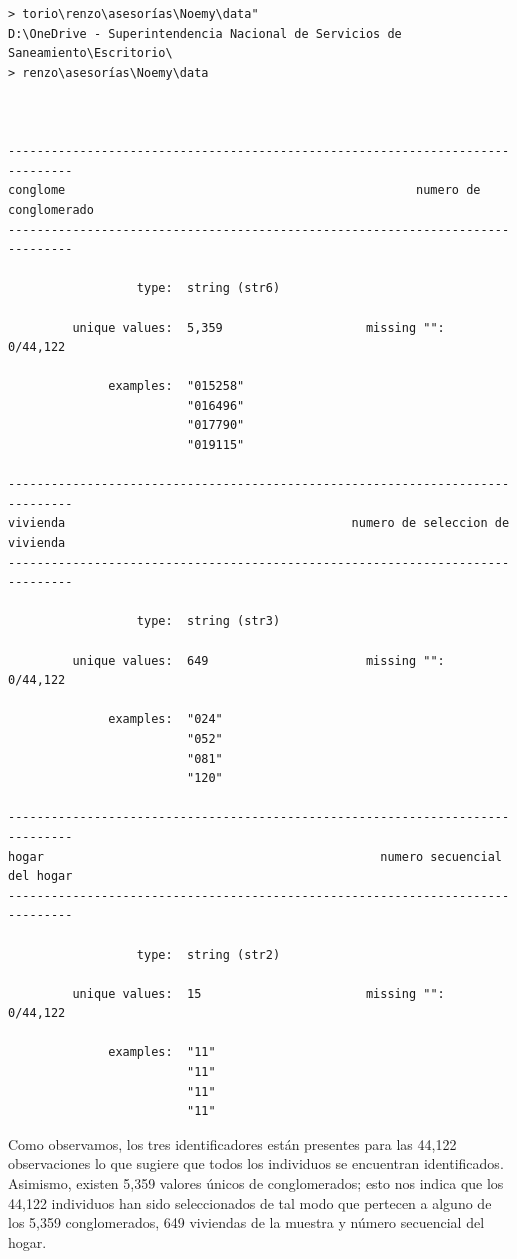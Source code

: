 \documentclass[
]{book}
\theoremstyle{definition}
\theoremstyle{definition}
\theoremstyle{definition}
\theoremstyle{definition}
\theoremstyle{remark}
\begin{document}
\begin{verbatim}
> torio\renzo\asesorías\Noemy\data"
D:\OneDrive - Superintendencia Nacional de Servicios de Saneamiento\Escritorio\
> renzo\asesorías\Noemy\data



-------------------------------------------------------------------------------
conglome                                                 numero de conglomerado
-------------------------------------------------------------------------------

                  type:  string (str6)

         unique values:  5,359                    missing "":  0/44,122

              examples:  "015258"
                         "016496"
                         "017790"
                         "019115"

-------------------------------------------------------------------------------
vivienda                                        numero de seleccion de vivienda
-------------------------------------------------------------------------------

                  type:  string (str3)

         unique values:  649                      missing "":  0/44,122

              examples:  "024"
                         "052"
                         "081"
                         "120"

-------------------------------------------------------------------------------
hogar                                               numero secuencial del hogar
-------------------------------------------------------------------------------

                  type:  string (str2)

         unique values:  15                       missing "":  0/44,122

              examples:  "11"
                         "11"
                         "11"
                         "11"
\end{verbatim}

Como observamos, los tres identificadores están presentes para las 44,122 observaciones lo que sugiere que todos los individuos se encuentran identificados. Asimismo, existen 5,359 valores únicos de conglomerados; esto nos indica que los 44,122 individuos han sido seleccionados de tal modo que pertecen a alguno de los 5,359 conglomerados, 649 viviendas de la muestra y número secuencial del hogar.
\end{document}

